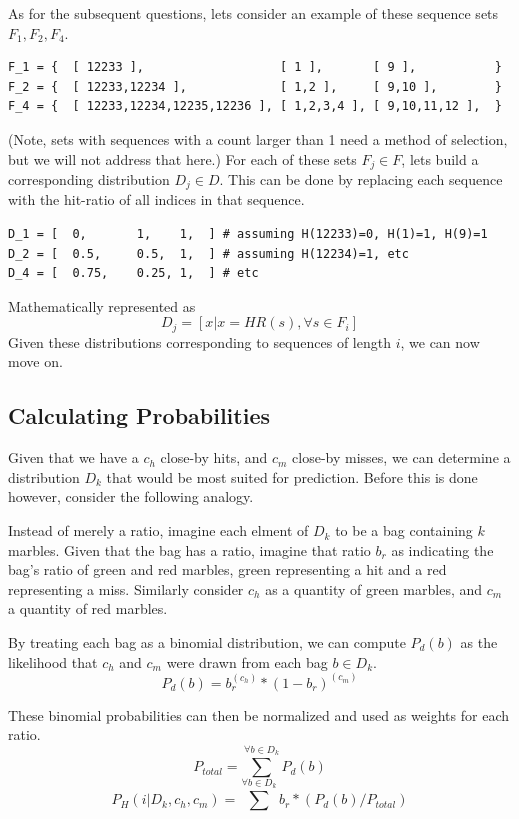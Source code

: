 \documentclass{article}
\newcommand{\br}{ \hfill \break}
\begin{document}
\begin{adjustwidth}{2.5em}{0pt}
        As for the subsequent questions, lets consider an example of these sequence sets $F_1, F_2, F_4$.
        \begin{lstlisting}
F_1 = {  [ 12233 ],                   [ 1 ],       [ 9 ],           }
F_2 = {  [ 12233,12234 ],             [ 1,2 ],     [ 9,10 ],        }
F_4 = {  [ 12233,12234,12235,12236 ], [ 1,2,3,4 ], [ 9,10,11,12 ],  }
        \end{lstlisting}
        (Note, sets with sequences with a count larger than 1 need a method of selection, but we will not address that here.)\br
        For each of these sets $F_j \in F$, lets build a corresponding distribution $D_j \in D$. This can be done by replacing each sequence with the hit-ratio of all indices in that sequence.
        \begin{lstlisting}
D_1 = [  0,       1,    1,  ] # assuming H(12233)=0, H(1)=1, H(9)=1
D_2 = [  0.5,     0.5,  1,  ] # assuming H(12234)=1, etc
D_4 = [  0.75,    0.25, 1,  ] # etc
        \end{lstlisting}
        Mathematically represented as
        $$ D_j = [ x | x = \mathit{HR}(s), \forall s \in F_i  ]  $$
        Given these distributions corresponding to sequences of length $i$, we can now move on.
        
    \subsection{Calculating Probabilities}
        Given that we have a $c_h$ close-by hits, and $c_m$ close-by misses, we can determine a distribution $D_k$ that would be most suited for prediction. Before this is done however, consider the following analogy.\br\br
        
        Instead of merely a ratio, imagine each elment of $D_k$ to be a bag containing $k$ marbles. Given that the bag has a ratio, imagine that ratio $b_r$ as indicating the bag's ratio of green and red marbles, green representing a hit and a red representing a miss. Similarly consider $c_h$ as a quantity of green marbles, and $c_m$ a quantity of red marbles.\br\br
        
        By treating each bag as a binomial distribution, we can compute $P_d(b)$ as the likelihood that $c_h$ and $c_m$ were drawn from each bag $b \in D_k$.
                    $$ P_d(b) =  b_r^{(c_h)} * (1-b_r)^{(c_m)} $$
        
        These binomial probabilities can then be normalized and used as weights for each ratio. 
                    $$ P_\mathit{total} = \displaystyle\sum^{\forall b \in D_k} P_d(b) $$
                    $$ P_H(i | D_k, c_h, c_m) = \displaystyle\sum^{\forall b \in D_k} b_r * ( P_d(b) / P_\mathit{total} )  $$
        

\end{adjustwidth}
\end{document}
